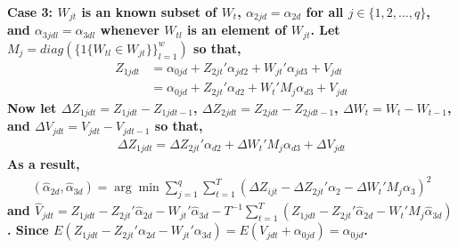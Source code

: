 \documentclass[10pt]{article}
\begin{document}
\noindent \bf Case 3: \rm $W_{jt}$ is an known subset of $W_{t}$, $\alpha_{2jd} = \alpha_{2d}$ for all $j \in \{1,2, \ldots,q\}$, and $\alpha_{3jdl} = \alpha_{3dl}$ whenever $W_{tl}$ is an element of $W_{jt}$. Let $M_j = diag(\{1\{ W_{tl} \in W_{jt}\} \}_{l=1}^w)$ so that,
%
\begin{align*}
Z_{1jdt} &= \alpha_{0jd} + Z_{2jt}' \alpha_{jd2} + W_{jt}' \alpha_{jd3} + V_{jdt} \\
& =\alpha_{0jd} + Z_{2jt}' \alpha_{d2} + W_{t}'M_j \alpha_{d3} + V_{jdt}
\end{align*}
Now let $\Delta Z_{1jdt} = Z_{1jdt} - Z_{1jdt-1}$, $\Delta Z_{2jdt} = Z_{2jdt} - Z_{2jdt-1}$, $\Delta W_{t} = W_{t} - W_{t-1}$, and $\Delta V_{jdt} = V_{jdt} - V_{jdt-1}$ so that, 
\begin{align*} 
\Delta Z_{1jdt} =\Delta Z_{2jt}' \alpha_{d2} + \Delta W_{t}'M_j \alpha_{d3} + \Delta V_{jdt}
\end{align*}
As a result,
%
\begin{align*} 
(\hat{\alpha}_{2d},\hat{\alpha}_{3d})  = \arg \min \sum_{j=1}^q\sum_{t=1}^T\left( \Delta Z_{ijt} -  \Delta Z_{2jt}'\alpha_{2} - \Delta W_{t}'M_j\alpha_{3} \right)^2 
\end{align*}
%
\noindent and $\hat{V}_{jdt} = Z_{1jdt} - Z_{2jt}'\hat{\alpha}_{2d} - W_{jt}'\hat{\alpha}_{3d} - T^{-1}\sum_{t=1}^T  (Z_{1jdt} - Z_{2jt}'\hat{\alpha}_{2d} - W_{t}'M_j\hat{\alpha}_{3d}) $. Since $E( Z_{1jdt} - Z_{2jt}'\alpha_{2d} - W_{jt}'\alpha_{3d})= E(V_{jdt} + \alpha_{0jd}) = \alpha_{0jd}$.  \\
\end{document}
